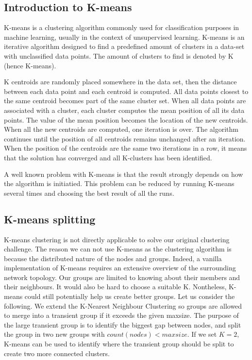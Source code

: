 \subsection{Introduction to K-means}
K-means is a clustering algorithm commonly used for classification purposes in machine learning, usually in the context of unsupervised learning. K-means
is an iterative algorithm designed to find a predefined amount of clusters in a data-set with unclassified data points. The amount of clusters to find is denoted by
K (hence K-means). 

K centroids are randomly placed somewhere in the data set, then the distance between each data point and each centroid is computed. All data points
closest to the same centroid becomes part of the same cluster set. When all data points are associated with a cluster, each cluster computes the mean position of all its data points.
The value of the mean position becomes the location of the new centroids. When all the new centroids are computed, one iteration is over. The algorithm continues until the position 
of all centroids remains unchanged after an iteration. When the position of the centroids are the same two iterations in a row, it means that the solution has converged and all K-clusters has been identified. 

A well known problem with K-means is that the result strongly depends on how the algorithm is initiatied. This problem can be reduced by running K-means several times
and choosing the best result of all the runs. 

\subsection{K-means splitting}
K-means clustering is not directly applicable to solve our original clustering challenge. The reason we can not use K-means as the clustering algorithm is because the distributed nature of
the nodes and groups. Indeed, a vanilla implementation of K-means requires an extensive overview of the surrounding network topology. Our groups are limited to knowing about their members
and their neighbours. It would also be hard to choose a suitable K. Nontheless, K-means could still potentially help us create better groups. Let us consider the following.
We extend the K-Nearest Neighbour Clustering so groups are allowed to merge into a transient group if it exceeds the given maxsize.
The purpose of the large transient group is to identify the biggest gap between nodes, and split the group in two new groups with
$count(nodes) < maxsize$. If we set $K=2$, K-means can be used to identify where the transient group should be split to create two more connected clusters. 

